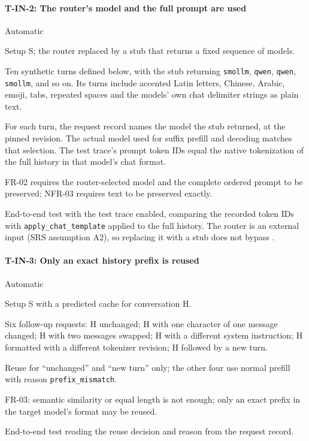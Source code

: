 \documentclass[12pt, titlepage]{article}
\newenvironment{testcase}[2]
  {\Needspace{8\baselineskip}\paragraph{#1: #2}\phantomsection\label{test:#1}\sloppy
   \begin{description}[style=sameline, leftmargin=3.6cm, labelwidth=3.4cm,
     font=\normalfont\bfseries, itemsep=2pt, topsep=2pt]}
  {\end{description}}
\begin{document}
\begin{testcase}{T-IN-2}{The router's model and the full prompt are used}
\item[Control] Automatic
\item[Initial state] Setup S; the router replaced by a stub that returns a
fixed sequence of models.
\item[Input] Ten synthetic turns defined below, with the stub
returning \texttt{smollm}, \texttt{qwen}, \texttt{qwen}, \texttt{smollm},
and so on. Its turns include accented Latin letters, Chinese, Arabic, emoji,
tabs, repeated spaces and the models' own chat delimiter strings as plain
text.
\item[Output] For each turn, the request record names the model the stub
returned, at the pinned revision. The actual model used for suffix prefill
and decoding matches that selection. The test trace's prompt token IDs
equal the native tokenization of the full history in that model's chat format.
\item[Derivation] FR-02 requires the router-selected model and the
complete ordered prompt to be preserved; NFR-03 requires text to be
preserved exactly.
\item[How performed] End-to-end test with the test trace enabled, comparing the
recorded token IDs with \texttt{apply\_chat\_template} applied to the full
history. The router is an external input (SRS assumption A2), so replacing
it with a stub does not bypass \progname{}.
\end{testcase}

\begin{testcase}{T-IN-3}{Only an exact history prefix is reused}
\item[Control] Automatic
\item[Initial state] Setup S with a predicted cache for conversation H.
\item[Input] Six follow-up requests: H unchanged; H with one character of
one message changed; H with two messages swapped; H with a different
system instruction; H formatted with a different tokenizer revision; H
followed by a new turn.
\item[Output] Reuse for ``unchanged'' and ``new turn'' only; the other four
use normal prefill with reason \texttt{prefix\_mismatch}.
\item[Derivation] FR-03: semantic similarity or equal length is not
enough; only an exact prefix in the target model's format may be reused.
\item[How performed] End-to-end test reading the reuse decision and reason from
the request record.
\end{testcase}
\end{document}
